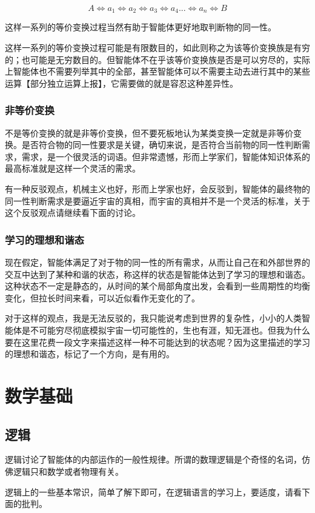 \documentclass[12pt,oneside]{book}
\begin{document}
\[
A \Leftrightarrow a_1 \Leftrightarrow a_2 \Leftrightarrow a_3 \Leftrightarrow a_4 ... \Leftrightarrow a_n \Leftrightarrow B 
\]

这样一系列的等价变换过程当然有助于智能体更好地取判断物的同一性。

这样一系列的等价变换过程可能是有限数目的，如此则称之为该等价变换族是有穷的；也可能是无穷数目的。但智能体不在乎该等价变换族是否是可以穷尽的，实际上智能体也不需要列举其中的全部，甚至智能体可以不需要主动去进行其中的某些运算【部分独立运算上报】，它需要做的就是容忍这种差异性。


\subsection{非等价变换}
不是等价变换的就是非等价变换，但不要死板地认为某类变换一定就是非等价变换。是否符合物的同一性要求是关键，确切来说，是否符合当前物的同一性判断需求，需求，是一个很灵活的词语。但非常遗憾，形而上学家们，智能体知识体系的最高标准就是这样一个灵活的需求。

有一种反驳观点，机械主义也好，形而上学家也好，会反驳到，智能体的最终物的同一性判断需求是要逼近宇宙的真相，而宇宙的真相并不是一个灵活的标准，关于这个反驳观点请继续看下面的讨论。

\subsection{学习的理想和谐态}
现在假定，智能体满足了对于物的同一性的所有需求，从而让自己在和外部世界的交互中达到了某种和谐的状态，称这样的状态是智能体达到了学习的理想和谐态。这种状态不一定是静态的，从时间的某个局部角度出发，会看到一些周期性的均衡变化，但拉长时间来看，可以近似看作无变化的了。

对于这样的观点，我是无法反驳的，我只能说考虑到世界的复杂性，小小的人类智能体是不可能穷尽彻底模拟宇宙一切可能性的，生也有涯，知无涯也。但我为什么要在这里花费一段文字来描述这样一种不可能达到的状态呢？因为这里描述的学习的理想和谐态，标记了一个方向，是有用的。

\chapter{数学基础}
\section{逻辑}
逻辑讨论了智能体的内部运作的一般性规律。所谓的数理逻辑是个奇怪的名词，仿佛逻辑只和数学或者物理有关。

逻辑上的一些基本常识，简单了解下即可，在逻辑语言的学习上，要适度，请看下面的批判。
\end{document}
